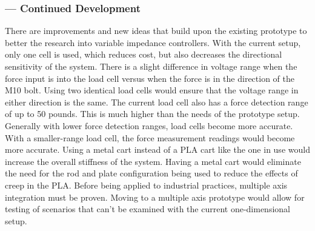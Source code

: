 \subsubsection*{ --- Continued Development}
There are improvements and new ideas that build upon the existing prototype to better the research into variable impedance controllers. With the current setup, only one cell is used, which reduces cost, but also decreases the directional sensitivity of the system. There is a slight difference in voltage range when the force input is into the load cell versus when the force is in the direction of the M10 bolt. Using two identical load cells would ensure that the voltage range in either direction is the same. The current load cell also has a force detection range of up to 50 pounds. This is much higher than the needs of the prototype setup. Generally with lower force detection ranges, load cells become more accurate. With a smaller-range load cell, the force measurement readings would become more accurate. Using a metal cart instead of a PLA cart like the one in use would increase the overall stiffness of the system. Having a metal cart would eliminate the need for the rod and plate configuration being used to reduce the effects of creep in the PLA. Before being applied to industrial practices, multiple axis integration must be proven. Moving to a multiple axis prototype would allow for testing of scenarios that can't be examined with the current one-dimensional setup.